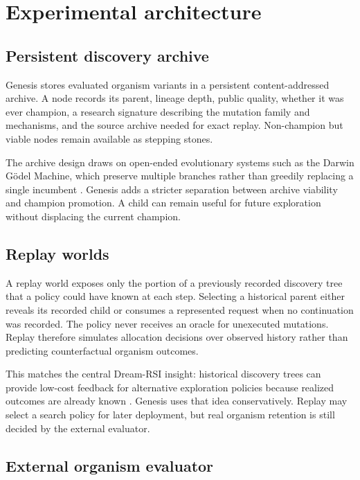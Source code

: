 \section{Experimental architecture}

\subsection{Persistent discovery archive}

Genesis stores evaluated organism variants in a persistent content-addressed archive. A node records its parent, lineage depth, public quality, whether it was ever champion, a research signature describing the mutation family and mechanisms, and the source archive needed for exact replay. Non-champion but viable nodes remain available as stepping stones.

The archive design draws on open-ended evolutionary systems such as the Darwin G\"odel Machine, which preserve multiple branches rather than greedily replacing a single incumbent \cite{zhang2025dgm}. Genesis adds a stricter separation between archive viability and champion promotion. A child can remain useful for future exploration without displacing the current champion.

\subsection{Replay worlds}

A replay world exposes only the portion of a previously recorded discovery tree that a policy could have known at each step. Selecting a historical parent either reveals its recorded child or consumes a represented request when no continuation was recorded. The policy never receives an oracle for unexecuted mutations. Replay therefore simulates allocation decisions over observed history rather than predicting counterfactual organism outcomes.

This matches the central Dream-RSI insight: historical discovery trees can provide low-cost feedback for alternative exploration policies because realized outcomes are already known \cite{zheng2026dreamrsi}. Genesis uses that idea conservatively. Replay may select a search policy for later deployment, but real organism retention is still decided by the external evaluator.

\subsection{External organism evaluator}


